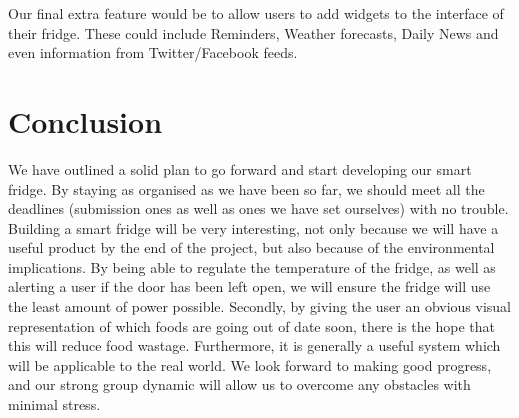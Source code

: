 \documentclass[10pt]{article}
\begin{document}
Our final extra feature would be to allow users to add widgets to the interface of their fridge. These could include Reminders, Weather forecasts, Daily News and even information from Twitter/Facebook feeds. 

\section{Conclusion}

We have outlined a solid plan to go forward and start developing our smart fridge. By staying as organised as we have been so far, we should meet all the deadlines (submission ones as well as ones we have set ourselves) with no trouble. Building a smart fridge will be very interesting, not only because we will have a useful product by the end of the project, but also because of the environmental implications. By being able to regulate the temperature of the fridge, as well as alerting a user if the door has been left open, we will ensure the fridge will use the least amount of power possible. Secondly, by giving the user an obvious visual representation of which foods are going out of date soon, there is the hope that this will reduce food wastage. Furthermore, it is generally a useful system which will be applicable to the real world. We look forward to making good progress, and our strong group dynamic will allow us to overcome any obstacles with minimal stress.
\end{document}
